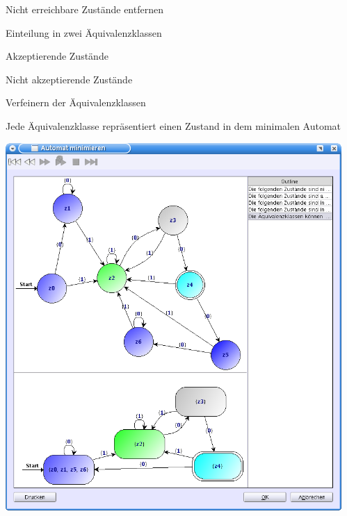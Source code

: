 {
    \begin{itemgroup}{}
	\item Nicht erreichbare Zustände entfernen
	\item Einteilung in zwei Äquivalenzklassen
		\begin{itemgroup}{}
		\item Akzeptierende Zustände
		\item Nicht akzeptierende Zustände
		\end{itemgroup}
	\item Verfeinern der Äquivalenzklassen
	\item Jede Äquivalenzklasse repräsentiert einen Zustand in dem minimalen
	Automat
	\end{itemgroup}
	
	\vfill{}    
}


{
  \begin{center}
    \includegraphics[height=14cm]{../images/minimize.png}
  \end{center}   
}


